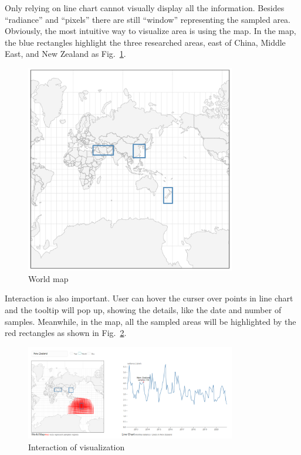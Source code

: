 \documentclass[conference]{IEEEtran}
\begin{document}
Only relying on line chart cannot visually display all the information. Besides “radiance” and “pixels” there are still “window” representing the sampled area. Obviously, the most intuitive way to visualize area is using the map. In the map, the blue rectangles highlight the three researched areas, east of China, Middle East, and New Zealand as Fig.~\ref{wmap}.

\begin{figure}[htbp]
    \centerline{\includegraphics[width=260pt]{images/Worldmap.png}}
    \caption{World map}
    \label{wmap}
\end{figure}

Interaction is also important. User can hover the curser over points in line chart and the tooltip will pop up, showing the details, like the date and number of samples. Meanwhile, in the map, all the sampled areas will be highlighted by the red rectangles as shown in Fig.~\ref{iov}.

\begin{figure}[htbp]
    \centerline{\includegraphics[width=260pt]{images/Interaction_of_visualization.png}}
    \caption{Interaction of visualization}
    \label{iov}
\end{figure}
\end{document}
